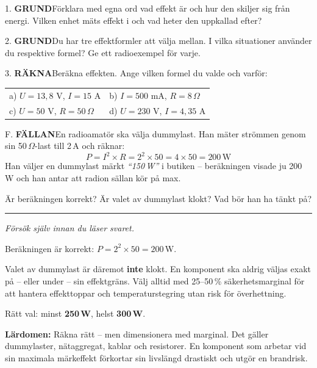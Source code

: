 \documentclass[a4paper,11pt,twoside]{book}
\newcommand{\qgrund}{\colorbox{greenpale}{\textcolor{greendark}{\headingfont\bfseries\tiny GRUND}}}
\newcommand{\qrakna}{\colorbox{bluepale}{\textcolor{bluedark}{\headingfont\bfseries\tiny RÄKNA}}}
\newcommand{\qfallan}{\colorbox{ljusbrun}{\textcolor{kakao}{\headingfont\bfseries\tiny FÄLLAN}}}
\begin{document}
\begin{qblock}{1.}
\qgrund\quad Förklara med egna ord vad effekt är och hur den skiljer sig från energi. Vilken enhet mäts effekt i och vad heter den uppkallad efter?
\end{qblock}

\begin{qblock}{2.}
\qgrund\quad Du har tre effektformler att välja mellan. I vilka situationer använder du respektive formel? Ge ett radioexempel för varje.
\end{qblock}

\begin{qblock}{3.}
\qrakna\quad Beräkna effekten. Ange vilken formel du valde och varför:
\begin{center}
\begin{tabular}{ll}
a) $U = 13{,}8$ V, $I = 15$ A &
b) $I = 500$ mA, $R = 8\,\Omega$ \\[4pt]
c) $U = 50$ V, $R = 50\,\Omega$ &
d) $U = 230$ V, $I = 4{,}35$ A
\end{tabular}
\end{center}
\end{qblock}

\begin{qblock}{F.}
\qfallan\quad En radioamatör ska välja dummylast. 
Han mäter strömmen genom sin 50\,$\Omega$-last till 2\,A 
och räknar:
\[
P = I^2 \times R = 2^2 \times 50 = 4 \times 50 = 200\,\text{W}
\]
Han väljer en dummylast märkt \emph{``150\,W''} i butiken --
beräkningen visade ju 200\,W och han antar att radion 
sällan kör på max.

Är beräkningen korrekt? Är valet av dummylast klokt? 
Vad bör han ha tänkt på?
\end{qblock}

\medskip
\noindent\rule{\textwidth}{0.4pt}
{\small\itshape Försök själv innan du läser svaret.}
\medskip

\begin{worked}[title={Lösning – Fallgropsfråga 1.3.1\,F}]
Beräkningen är korrekt: $P = 2^2 \times 50 = 200$\,W.

Valet av dummylast är däremot \textbf{inte} klokt. En komponent 
ska aldrig väljas exakt på -- eller under -- sin effektgräns. 
Välj alltid med 25--50\,\% säkerhetsmarginal för att hantera 
effekttoppar och temperaturstegring utan risk för överhettning.

Rätt val: minst \textbf{250\,W}, helst \textbf{300\,W}.

\textbf{Lärdomen:} Räkna rätt -- men dimensionera med marginal. 
Det gäller dummylaster, nätaggregat, kablar och resistorer. 
En komponent som arbetar vid sin maximala märkeffekt förkortar 
sin livslängd drastiskt och utgör en brandrisk.
\end{worked}
\end{document}
